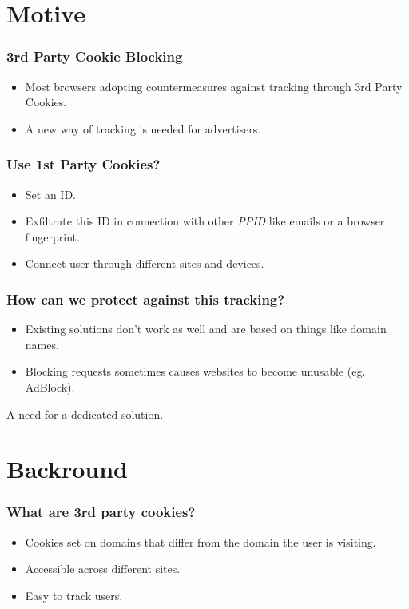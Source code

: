 \documentclass{beamer}
\begin{document}
\section{Motive}

\begin{frame}
\frametitle{3rd Party Cookie Blocking}

\begin{itemize}
\item Most browsers adopting countermeasures against tracking through 3rd Party Cookies.
\item A new way of tracking is needed for advertisers.
\end{itemize}

\end{frame}

\begin{frame}
\frametitle{Use 1st Party Cookies?}

\begin{itemize}
\item Set an ID.
\item Exfiltrate this ID in connection with other \textit{PPID} like emails or a browser fingerprint.
\item Connect user through different sites and devices.
\end{itemize}

\end{frame}

\begin{frame}
\frametitle{How can we protect against this tracking?}

\begin{itemize}
\item Existing solutions don't work as well and are based on things like domain names.
\item Blocking requests sometimes causes websites to become unusable (eg. AdBlock).
\end{itemize}

\end{frame}

\begin{frame}
\centering
A need for a dedicated solution.
\end{frame}


\section{Backround}

\begin{frame}
\frametitle{What are 3rd party cookies?}

\begin{itemize}

\item Cookies set on domains that differ from the domain the user is visiting.
\item Accessible across different sites.
\item Easy to track users.

\end{itemize}

\end{frame}
\end{document}
